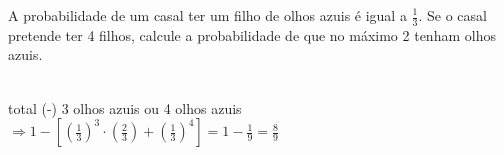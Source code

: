 \begin{ex}
 A probabilidade de um casal ter um filho de olhos azuis é igual a $\frac{1}{3}$. Se o casal pretende ter 4 filhos, calcule a probabilidade de que no máximo 2 tenham olhos azuis.
   \begin{sol}
      \phantom{A}  \\
      total (-) 3 olhos azuis ou 4 olhos azuis 
      $ \Longrightarrow 1-[(\frac{1}{3})^3\cdot(\frac{2}{3}) + (\frac{1}{3})^4]=1-\frac{1}{9}=\frac{8}{9}$
      
   \end{sol}
\end{ex}